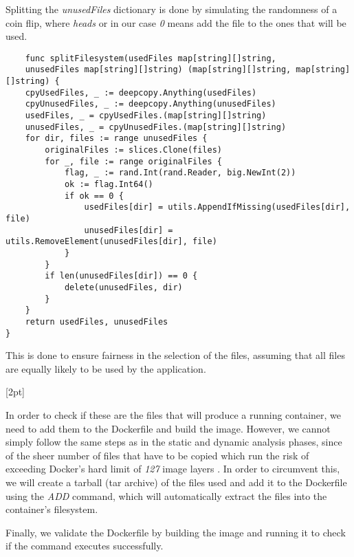 Splitting the \textit{unusedFiles} dictionary is done by simulating the randomness of a coin flip, where \textit{heads} or in our case \textit{0} means add the file to the ones
that will be used.
\lstset{language=Go,caption=Splitting the filesystem,label=lst:split-filesystem}
\begin{lstlisting}
	func splitFilesystem(usedFiles map[string][]string,
	unusedFiles map[string][]string) (map[string][]string, map[string][]string) {
	cpyUsedFiles, _ := deepcopy.Anything(usedFiles)
	cpyUnusedFiles, _ := deepcopy.Anything(unusedFiles)
	usedFiles, _ = cpyUsedFiles.(map[string][]string)
	unusedFiles, _ = cpyUnusedFiles.(map[string][]string)
	for dir, files := range unusedFiles {
		originalFiles := slices.Clone(files)
		for _, file := range originalFiles {
			flag, _ := rand.Int(rand.Reader, big.NewInt(2))
			ok := flag.Int64()
			if ok == 0 {
				usedFiles[dir] = utils.AppendIfMissing(usedFiles[dir], file)
				unusedFiles[dir] = utils.RemoveElement(unusedFiles[dir], file)
			}
		}
		if len(unusedFiles[dir]) == 0 {
			delete(unusedFiles, dir)
		}
	}
	return usedFiles, unusedFiles
}
\end{lstlisting}

This is done to ensure fairness in the selection of the files, assuming that all files are equally likely to be used by the application.

[2pt]


In order to check if these are the files that will produce a running container, we need to add them to the Dockerfile and build the image. However, we cannot simply follow the 
same steps as in the static and dynamic analysis phases, since of the sheer number of files that have to be copied which run the risk of exceeding Docker's hard limit of \textit{127} image layers
\cite{docker-layers}. In order to circumvent this, we will create a tarball (tar archive) of the files used and add it to the Dockerfile using the \textit{ADD} command, which will automatically extract the files 
into the container's filesystem.


Finally, we validate the Dockerfile by building the image and running it to check if the command executes successfully. 